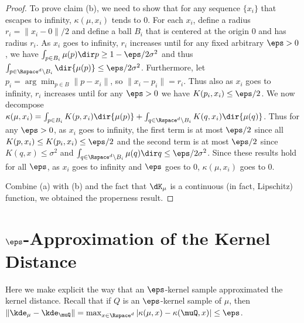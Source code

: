 \documentclass[11pt]{myclass}
\begin{document}
\begin{proof}
To prove claim (b), we need to show that for any sequence $\{x_i\}$ that escapes to infinity, $\kappa(\mu, x_i)$ tends to $0$.  
For each $x_i$, define a radius $r_i = \|x_i - 0\|/2$ and define a ball $B_i$ that is centered at the origin $0$ and has radius $r_i$.  As $x_i$ goes to infinity, $r_i$ increases until for any fixed arbitrary $\eps > 0$,  we have $\int_{p \in B_i} \mu(p) \dir p \geq 1-\eps/2\sigma^2$ and thus $\int_{p \in \Rspace^d \setminus B_i} \dir{\mu(p)} \leq \eps/2\sigma^2$.  Furthermore, let $p_i = \arg\min_{p \in B} \|p - x_i\|$, so $\|x_i - p_i\| = r_i$.  Thus also as $x_i$ goes to infinity, $r_i$ increases until for any $\eps > 0$ we have $K(p_i,x_i) \leq \eps/2$.  
We now decompose $\kappa(\mu,x_i) = \int_{p \in B_i} K(p,x_i) \dir{\mu(p)} + \int_{q \in \Rspace^d \setminus B_i} K(q,x_i) \dir{\mu(q)}$.  
Thus for any $\eps >0$, as $x_i$ goes to infinity, the first term is at most $\eps/2$ since all $K(p,x_i) \leq K(p_i,x_i) \leq \eps/2$ and the second term is at most $\eps/2$ since $K(q,x) \leq \sigma^2$ and $\int_{q \in \Rspace^d \setminus B_i} \mu(q) \dir q \leq \eps / 2 \sigma^2$.  
Since these results hold for all $\eps$, as $x_i$ goes to infinity and $\eps$ goes to $0$, 
$\kappa(\mu,x_i)$ goes to $0$.  

Combine (a) with (b) and the fact that $\dK_{\mu}$ is a continuous (in fact, Lipschitz) function, we obtained the properness result. 
\end{proof}



\section{$\eps$-Approximation of the Kernel Distance}
\label{app:KD-approx}

Here we make explicit the way that an $\eps$-kernel sample approximated the kernel distance.  
Recall that if $Q$ is an $\eps$-kernel sample of $\mu$, then $\|\kde_\mu - \kde_\muQ \| =  \max_{x \in \Rspace^d} | \kappa(\mu,x) - \kappa(\muQ,x) | \leq \eps$.  
\end{document}
